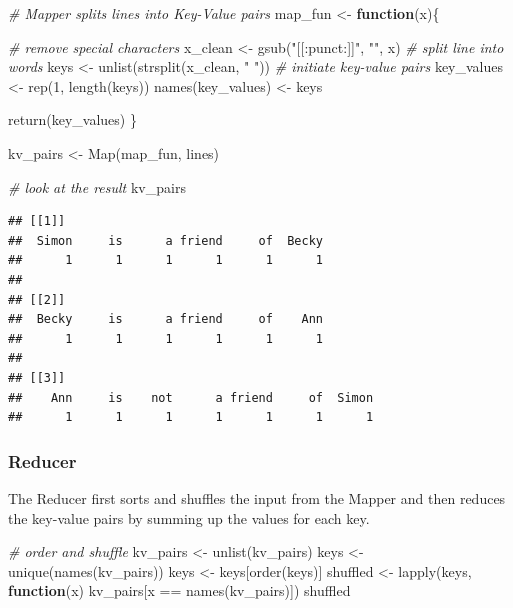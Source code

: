 \documentclass[
  12pt,
]{style/krantz}
\newenvironment{Shaded}{\begin{snugshade}}{\end{snugshade}}
\newcommand{\CommentTok}[1]{\textcolor[rgb]{0.56,0.35,0.01}{\textit{#1}}}
\newcommand{\ControlFlowTok}[1]{\textcolor[rgb]{0.13,0.29,0.53}{\textbf{#1}}}
\newcommand{\DecValTok}[1]{\textcolor[rgb]{0.00,0.00,0.81}{#1}}
\newcommand{\FunctionTok}[1]{\textcolor[rgb]{0.00,0.00,0.00}{#1}}
\newcommand{\NormalTok}[1]{#1}
\newcommand{\OtherTok}[1]{\textcolor[rgb]{0.56,0.35,0.01}{#1}}
\newcommand{\SpecialCharTok}[1]{\textcolor[rgb]{0.00,0.00,0.00}{#1}}
\newcommand{\StringTok}[1]{\textcolor[rgb]{0.31,0.60,0.02}{#1}}
\begin{document}
\begin{Shaded}
\begin{Highlighting}[]
\CommentTok{\# Mapper splits lines into Key{-}Value pairs}
\NormalTok{map\_fun }\OtherTok{\textless{}{-}}
     \ControlFlowTok{function}\NormalTok{(x)\{}
          
          \CommentTok{\# remove special characters}
\NormalTok{          x\_clean }\OtherTok{\textless{}{-}} \FunctionTok{gsub}\NormalTok{(}\StringTok{"[[:punct:]]"}\NormalTok{, }\StringTok{""}\NormalTok{, x)}
          \CommentTok{\# split line into words}
\NormalTok{          keys }\OtherTok{\textless{}{-}} \FunctionTok{unlist}\NormalTok{(}\FunctionTok{strsplit}\NormalTok{(x\_clean, }\StringTok{" "}\NormalTok{))}
          \CommentTok{\# initiate key{-}value pairs}
\NormalTok{          key\_values }\OtherTok{\textless{}{-}} \FunctionTok{rep}\NormalTok{(}\DecValTok{1}\NormalTok{, }\FunctionTok{length}\NormalTok{(keys))}
          \FunctionTok{names}\NormalTok{(key\_values) }\OtherTok{\textless{}{-}}\NormalTok{ keys}
          
          \FunctionTok{return}\NormalTok{(key\_values)}
\NormalTok{     \}}

\NormalTok{kv\_pairs }\OtherTok{\textless{}{-}} \FunctionTok{Map}\NormalTok{(map\_fun, lines)}

\CommentTok{\# look at the result}
\NormalTok{kv\_pairs}
\end{Highlighting}
\end{Shaded}

\begin{verbatim}
## [[1]]
##  Simon     is      a friend     of  Becky 
##      1      1      1      1      1      1 
## 
## [[2]]
##  Becky     is      a friend     of    Ann 
##      1      1      1      1      1      1 
## 
## [[3]]
##    Ann     is    not      a friend     of  Simon 
##      1      1      1      1      1      1      1
\end{verbatim}

\hypertarget{reducer}{%
\subsubsection{Reducer}\label{reducer}}

The Reducer first sorts and shuffles the input from the Mapper and then reduces the key-value pairs by summing up the values for each key.

\begin{Shaded}
\begin{Highlighting}[]
\CommentTok{\# order and shuffle}
\NormalTok{kv\_pairs }\OtherTok{\textless{}{-}} \FunctionTok{unlist}\NormalTok{(kv\_pairs)}
\NormalTok{keys }\OtherTok{\textless{}{-}} \FunctionTok{unique}\NormalTok{(}\FunctionTok{names}\NormalTok{(kv\_pairs))}
\NormalTok{keys }\OtherTok{\textless{}{-}}\NormalTok{ keys[}\FunctionTok{order}\NormalTok{(keys)]}
\NormalTok{shuffled }\OtherTok{\textless{}{-}} \FunctionTok{lapply}\NormalTok{(keys,}
                    \ControlFlowTok{function}\NormalTok{(x) kv\_pairs[x }\SpecialCharTok{==} \FunctionTok{names}\NormalTok{(kv\_pairs)])}
\NormalTok{shuffled}
\end{Highlighting}
\end{Shaded}
\end{document}
